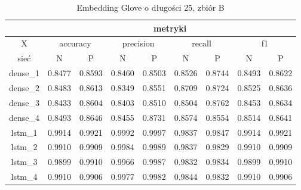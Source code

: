 \begin{table}[p] \label{tab:wyniki_glove_B} \centering
    \caption{Embedding Glove o długości 25, zbiór B}
    \begin{tabular} {|c|c|c|c|c|c|c|c|c| }    \hline
                 & \multicolumn{8}{c|}{metryki}                                                                                                                               \\ \hline
        X        & \multicolumn{2}{c|}{accuracy} & \multicolumn{2}{c|}{precision} & \multicolumn{2}{c|}{recall} & \multicolumn{2}{c|}{f1}                                     \\ \hline
        sieć     & N                             & P                              & N                           & P                       & N      & P      & N      & P      \\ \hline
        dense\_1 & 0.8477                        & 0.8593                         & 0.8460                      & 0.8503                  & 0.8526 & 0.8744 & 0.8493 & 0.8622 \\ \hline
        dense\_2 & 0.8483                        & 0.8613                         & 0.8349                      & 0.8551                  & 0.8709 & 0.8724 & 0.8525 & 0.8636 \\ \hline
        dense\_3 & 0.8433                        & 0.8604                         & 0.8403                      & 0.8510                  & 0.8504 & 0.8762 & 0.8453 & 0.8634 \\ \hline
        dense\_4 & 0.8493                        & 0.8646                         & 0.8455                      & 0.8731                  & 0.8574 & 0.8554 & 0.8514 & 0.8641 \\ \hline
        lstm\_1  & 0.9914                        & 0.9921                         & 0.9992                      & 0.9997                  & 0.9837 & 0.9847 & 0.9914 & 0.9921 \\ \hline
        lstm\_2  & 0.9910                        & 0.9909                         & 0.9984                      & 0.9989                  & 0.9837 & 0.9829 & 0.9910 & 0.9909 \\ \hline
        lstm\_3  & 0.9899                        & 0.9910                         & 0.9966                      & 0.9987                  & 0.9832 & 0.9834 & 0.9899 & 0.9910 \\ \hline
        lstm\_4  & 0.9910                        & 0.9906                         & 0.9977                      & 0.9982                  & 0.9844 & 0.9832 & 0.9910 & 0.9906 \\ \hline

\end{tabular}
\end{table}
